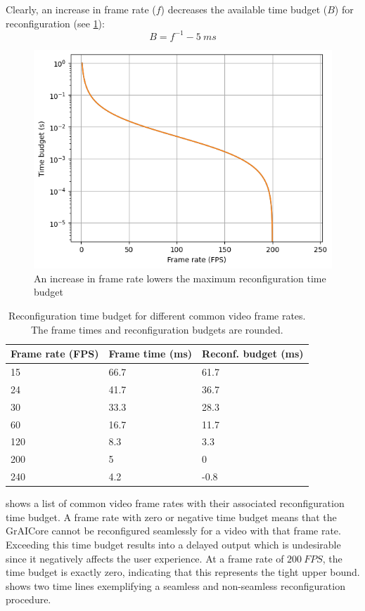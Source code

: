 Clearly, an increase in frame rate ($f$) decreases the available time budget ($B$) for reconfiguration (see \cref{fig:fps_vs_budget}):
\begin{equation}
    B = f^{-1} - \SI{5}{ms}
\end{equation}

\begin{figure}[htbp]
    \centering
    \includegraphics[width=0.5\linewidth]{assets/fps_vs_budget.png}
    \caption{An increase in frame rate lowers the maximum reconfiguration time budget}
    \label{fig:fps_vs_budget}
\end{figure}

\begin{table}[htbp]
\centering
\begin{tabular}{@{}lll@{}}
\toprule
Frame rate (FPS) & Frame time (ms) & Reconf. budget (ms) \\ \midrule
15               & 66.7            & 61.7                \\
24               & 41.7            & 36.7                \\
30               & 33.3            & 28.3                \\
60               & 16.7            & 11.7                \\
120              & 8.3             & 3.3                 \\
200              & 5               & 0                   \\
240              & 4.2             & -0.8                \\ \bottomrule
\end{tabular}
\caption{Reconfiguration time budget for different common video frame rates. The frame times and reconfiguration budgets are rounded.}
\label{tab:common_fps}
\end{table}

 shows a list of common video frame rates with their associated reconfiguration time budget.
A frame rate with zero or negative time budget means that the GrAICore cannot be reconfigured seamlessly for a video with that frame rate.
Exceeding this time budget results into a delayed output which is undesirable since it negatively affects the user experience.
At a frame rate of $\SI{200}{FPS}$, the time budget is exactly zero, indicating that this represents the tight upper bound.
 shows two time lines exemplifying a seamless and non-seamless reconfiguration procedure.

